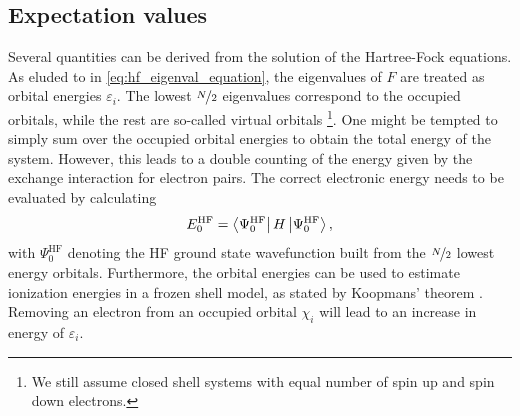 \subsection{Expectation values}
\label{subsec:background_hf_derived_quantities}
Several quantities can be derived from the solution of the Hartree-Fock equations. As eluded to in \autoref{eq:hf_eigenval_equation}, the eigenvalues of $F$ are treated as orbital energies $\varepsilon_i$. 
The lowest $\nicefrac{N}{2}$ eigenvalues correspond to the occupied orbitals, while the rest are so-called virtual orbitals \footnote{We still assume closed shell systems with equal number of spin up and spin down electrons.}. One might be tempted to simply sum over the occupied orbital energies to obtain the total energy of the system. However, this leads to a double counting of the energy given by the exchange interaction for electron pairs. The correct electronic energy needs to be evaluated by calculating
\begin{equation}
    \label{eq:elec_energy_hf_gs}
    E^\text{HF}_0 =  \bra{\Psi^\text{HF}_0} H \ket{\Psi^\text{HF}_0},
\end{equation}
with $\Psi^\text{HF}_0$ denoting the HF ground state wavefunction built from the $\nicefrac{N}{2}$ lowest energy orbitals.
Furthermore, the orbital energies can be used to estimate ionization energies in a frozen shell model, as stated by Koopmans' theorem \parencite{ref:koopmans1934}. Removing an electron from an occupied orbital $\chi_i$ will lead to an increase in energy of $\varepsilon_i$.\\

